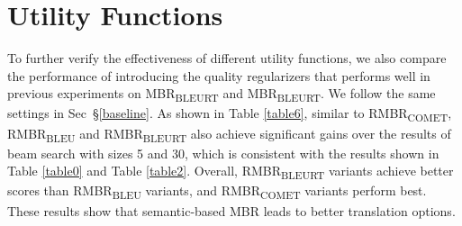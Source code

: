 \documentclass{article}
\begin{document}
\section{Utility Functions}
\label{utility function}
To further verify the effectiveness of different utility functions, we also compare the performance of introducing the quality regularizers that performs well in previous experiments on MBR\textsubscript{BLEURT} and MBR\textsubscript{BLEURT}. We follow the same settings in Sec~\S\ref{baseline}. As shown in Table \ref{table6}, similar to RMBR\textsubscript{COMET}, RMBR\textsubscript{BLEU} and RMBR\textsubscript{BLEURT} also achieve significant gains over the results of beam search with sizes 5 and 30, which is consistent with the results shown in Table \ref{table0} and Table \ref{table2}. Overall, RMBR\textsubscript{BLEURT} variants achieve better scores than RMBR\textsubscript{BLEU} variants, and RMBR\textsubscript{COMET} variants perform best. These results show that semantic-based MBR leads to better translation options.
\end{document}
